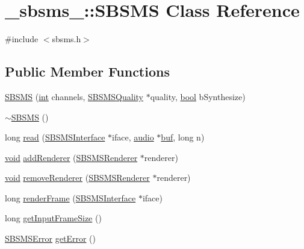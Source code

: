 \hypertarget{class__sbsms___1_1_s_b_s_m_s}{}\section{\+\_\+sbsms\+\_\+\+:\+:S\+B\+S\+MS Class Reference}
\label{class__sbsms___1_1_s_b_s_m_s}


{\ttfamily \#include $<$sbsms.\+h$>$}

\subsection*{Public Member Functions}
\begin{DoxyCompactItemize}
\item 
\hyperlink{class__sbsms___1_1_s_b_s_m_s_a43fbf4f2907d406ac1ac49de46363c5a}{S\+B\+S\+MS} (\hyperlink{xmltok_8h_a5a0d4a5641ce434f1d23533f2b2e6653}{int} channels, \hyperlink{class__sbsms___1_1_s_b_s_m_s_quality}{S\+B\+S\+M\+S\+Quality} $\ast$quality, \hyperlink{mac_2config_2i386_2lib-src_2libsoxr_2soxr-config_8h_abb452686968e48b67397da5f97445f5b}{bool} b\+Synthesize)
\item 
\hyperlink{class__sbsms___1_1_s_b_s_m_s_a5f9b34b464bf9709bc73aa54f310bf21}{$\sim$\+S\+B\+S\+MS} ()
\item 
long \hyperlink{class__sbsms___1_1_s_b_s_m_s_a6f66bc72688d37ee31c0995e33744424}{read} (\hyperlink{class__sbsms___1_1_s_b_s_m_s_interface}{S\+B\+S\+M\+S\+Interface} $\ast$iface, \hyperlink{namespace__sbsms___a11786cc5bd221ff534972ae350477324}{audio} $\ast$\hyperlink{xlstr_8c_a781718f5b53a876fe91c424c4607fa8f}{buf}, long n)
\item 
\hyperlink{sound_8c_ae35f5844602719cf66324f4de2a658b3}{void} \hyperlink{class__sbsms___1_1_s_b_s_m_s_a25c3b14e56c2e5f3db053665fa1450e0}{add\+Renderer} (\hyperlink{class__sbsms___1_1_s_b_s_m_s_renderer}{S\+B\+S\+M\+S\+Renderer} $\ast$renderer)
\item 
\hyperlink{sound_8c_ae35f5844602719cf66324f4de2a658b3}{void} \hyperlink{class__sbsms___1_1_s_b_s_m_s_a1548765908189eec29c130e3b748cd6f}{remove\+Renderer} (\hyperlink{class__sbsms___1_1_s_b_s_m_s_renderer}{S\+B\+S\+M\+S\+Renderer} $\ast$renderer)
\item 
long \hyperlink{class__sbsms___1_1_s_b_s_m_s_ab8e476ac873413784a8705811abe1946}{render\+Frame} (\hyperlink{class__sbsms___1_1_s_b_s_m_s_interface}{S\+B\+S\+M\+S\+Interface} $\ast$iface)
\item 
long \hyperlink{class__sbsms___1_1_s_b_s_m_s_a5e72172aa6f4b2f5cdfbc0b7251a320c}{get\+Input\+Frame\+Size} ()
\item 
\hyperlink{namespace__sbsms___af8e4cc216d7a51d2de2c5ce55eb3ce19}{S\+B\+S\+M\+S\+Error} \hyperlink{class__sbsms___1_1_s_b_s_m_s_a021b893d2a5d6dd4a27c84fce5309119}{get\+Error} ()
\end{DoxyCompactItemize}
